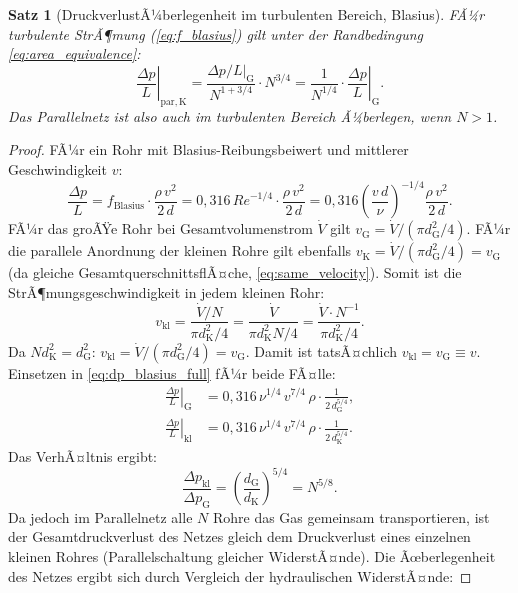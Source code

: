 ﻿\documentclass[12pt,a4paper,twoside]{article}
\theoremstyle{plain}
\newtheorem{theorem}{Satz}[section]
\theoremstyle{definition}
\theoremstyle{remark}
\newcommand{\Rey}{\mathit{Re}}
\newcommand{\dpL}{\Delta p / L}
\newcommand{\dG}{d_{\mathrm{G}}}
\newcommand{\dK}{d_{\mathrm{K}}}
\begin{document}
\begin{theorem}[DruckverlustÃ¼berlegenheit im turbulenten Bereich, Blasius]
\label{thm:druckverlust_turb}
FÃ¼r turbulente StrÃ¶mung (\cref{eq:f_blasius}) gilt unter der Randbedingung
\cref{eq:area_equivalence}:
\begin{equation}
  \left.\frac{\Delta p}{L}\right|_{\mathrm{par,K}}
  = \frac{\dpL|_{\mathrm{G}}}{N^{1+3/4}} \cdot N^{3/4}
  = \frac{1}{N^{1/4}} \cdot \left.\frac{\Delta p}{L}\right|_{\mathrm{G}}.
  \label{eq:blasius_ratio}
\end{equation}
Das Parallelnetz ist also auch im turbulenten Bereich Ã¼berlegen, wenn $N > 1$.
\end{theorem}

\begin{proof}
FÃ¼r ein Rohr mit Blasius-Reibungsbeiwert und mittlerer Geschwindigkeit $v$:
\begin{equation}
  \frac{\Delta p}{L}
    = f_{\mathrm{Blasius}} \cdot \frac{\rho\,v^2}{2\,d}
    = 0{,}316 \, \Rey^{-1/4} \cdot \frac{\rho\,v^2}{2\,d}
    = 0{,}316 \left(\frac{v\,d}{\nu}\right)^{-1/4} \frac{\rho\,v^2}{2\,d}.
  \label{eq:dp_blasius_full}
\end{equation}
FÃ¼r das groÃŸe Rohr bei Gesamtvolumenstrom $\dot{V}$ gilt
$v_{\mathrm{G}} = \dot{V} / (\pi\dG^2/4)$.
FÃ¼r die parallele Anordnung der kleinen Rohre gilt ebenfalls
$v_{\mathrm{K}} = \dot{V} / (\pi\dG^2/4) = v_{\mathrm{G}}$ (da gleiche
GesamtquerschnittsflÃ¤che, \cref{eq:same_velocity}).
Somit ist die StrÃ¶mungsgeschwindigkeit in jedem kleinen Rohr:
\begin{equation}
  v_{\mathrm{kl}} = \frac{\dot{V}/N}{\pi\dK^2/4}
    = \frac{\dot{V}}{\pi\dK^2 N/4}
    = \frac{\dot{V} \cdot N^{-1}}{\pi \dK^2/4}.
  \label{eq:v_in_small}
\end{equation}
Da $N \dK^2 = \dG^2$:
$v_{\mathrm{kl}} = \dot{V} / (\pi\dG^2/4) = v_{\mathrm{G}}$.
Damit ist tatsÃ¤chlich $v_{\mathrm{kl}} = v_{\mathrm{G}} \equiv v$.
Einsetzen in \cref{eq:dp_blasius_full} fÃ¼r beide FÃ¤lle:
\begin{align}
  \left.\frac{\Delta p}{L}\right|_{\mathrm{G}}
    &= 0{,}316\,\nu^{1/4}\,v^{7/4}\,\rho \cdot \frac{1}{2\,d_{\mathrm{G}}^{5/4}}, \\
  \left.\frac{\Delta p}{L}\right|_{\mathrm{kl}}
    &= 0{,}316\,\nu^{1/4}\,v^{7/4}\,\rho \cdot \frac{1}{2\,d_{\mathrm{K}}^{5/4}}.
\end{align}
Das VerhÃ¤ltnis ergibt:
\begin{equation}
  \frac{\Delta p_{\mathrm{kl}}}{\Delta p_{\mathrm{G}}}
    = \left(\frac{d_{\mathrm{G}}}{d_{\mathrm{K}}}\right)^{5/4}
    = N^{5/8}.
  \label{eq:dp_ratio_blasius_per_pipe}
\end{equation}
Da jedoch im Parallelnetz alle $N$ Rohre das Gas gemeinsam transportieren,
ist der Gesamtdruckverlust des Netzes gleich dem Druckverlust eines
einzelnen kleinen Rohres (Parallel\-schaltung gleicher WiderstÃ¤nde).
Die Ãœberlegenheit des Netzes ergibt sich durch Vergleich der hydraulischen
WiderstÃ¤nde:


\end{proof}
\end{document}
